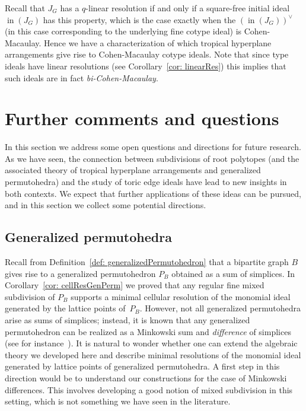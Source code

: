 \documentclass[11pt]{article}
\theoremstyle{definition}
\numberwithin{equation}{section}
\newcommand{\inn}{\operatorname{in}}
\begin{document}
Recall that $J_G$ has a $q$-linear resolution if and only if a square-free initial ideal $\inn(J_G)$ has this property, which is the case exactly when the $(\inn(J_G))^\vee$ (in this case corresponding to the underlying fine cotype ideal) is Cohen-Macaulay.  Hence we have a characterization of which tropical hyperplane arrangements give rise to Cohen-Macaulay cotype ideals.  Note that since type ideals have linear resolutions (see Corollary~\ref{cor: linearRes}) this implies that such ideals are in fact \emph{bi-Cohen-Macaulay}.

\section{Further comments and questions}\label{sec: GP}

In this section we address some open questions and directions for future research.  As we have seen, the connection between subdivisions of root polytopes (and the associated theory of tropical hyperplane arrangements and generalized permutohedra) and the study of toric edge ideals have lead to new insights in both contexts.  
We expect that further applications of these ideas can be pursued, and in this section we collect some potential directions.

\subsection{Generalized permutohedra}

Recall from Definition~\ref{def: generalizedPermutohedron} that a bipartite graph $B$ gives rise to a generalized permutohedron $P_B$ obtained as a sum of simplices. 
In Corollary~\ref{cor: cellResGenPerm} we proved that any regular fine mixed subdivision of $P_B$ supports a minimal cellular resolution of the monomial ideal generated by the lattice points of~$P_B$.  
However, not all generalized permutohedra arise as sums of simplices; instead, it is known that any generalized permutohedron can be realized as a Minkowski sum and \emph{difference} of simplices (see for instance~\cite{ArdBenDok}).  
It is natural to wonder whether one can extend the algebraic theory we developed here and describe minimal resolutions of the monomial ideal generated by lattice points of generalized permutohedra. A first step in this direction would be to understand our constructions for the case of Minkowski differences. This involves developing a good notion of mixed subdivision in this setting, which is not something we have seen in the literature.
\end{document}

